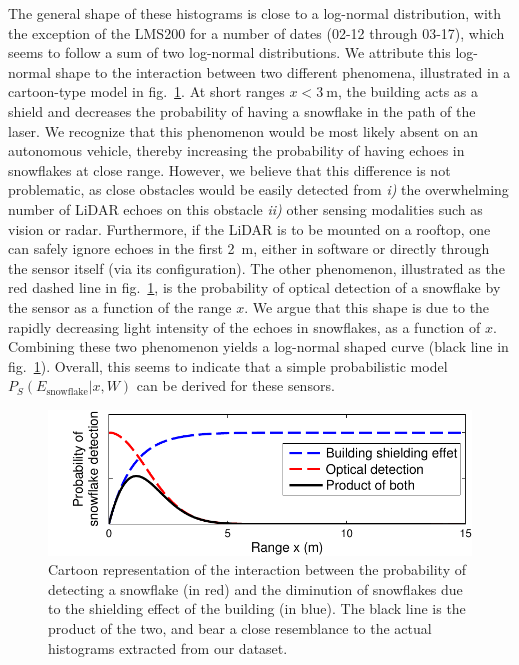 
The general shape of these histograms is close to a log-normal distribution, with the exception of the LMS200 for a number of dates (02-12 through 03-17), which seems to follow a sum of two log-normal distributions. We attribute this log-normal shape to the interaction between two different phenomena, illustrated in a cartoon-type model in fig.~\ref{fig:CartoonModel}. At short ranges $x<\SI{3}{\meter}$, the building acts as a shield and decreases the probability of having a snowflake in the path of the laser. We recognize that this phenomenon would be most likely absent on an autonomous vehicle, thereby increasing the probability of having echoes in snowflakes at close range. However, we believe that this difference is not problematic, as close obstacles would be easily detected from \emph{i)} the overwhelming number of  LiDAR echoes on this obstacle \emph{ii)} other sensing modalities such as vision or radar. Furthermore, if the LiDAR is to be mounted on a rooftop, one can safely ignore echoes in the first \SI{2}{\meter}, either in software or directly through the sensor itself (via its configuration). The other phenomenon, illustrated as the red dashed line in fig.~\ref{fig:CartoonModel}, is the probability of optical detection of a snowflake by the sensor as a function of the range $x$. We argue that this shape is due to the rapidly decreasing light intensity of the echoes in snowflakes, as a function of $x$. Combining these two phenomenon yields a log-normal shaped curve (black line in fig.~\ref{fig:CartoonModel}). Overall, this seems to indicate that a simple probabilistic model $P_S(E_\text{snowflake}|x,W)$ can be derived for these sensors. 

\begin{figure}[th]
    \centering
    \includegraphics[trim={0.6cm 0 0 0},clip,width=0.97\linewidth]{./img/ShieldingModel.pdf}
    \caption{Cartoon representation of the interaction between the probability of detecting a snowflake (in red) and the diminution of snowflakes due to the shielding effect of the building (in blue). The black line is the product of the two, and bear a close resemblance to the actual histograms extracted from our dataset.}
    \label{fig:CartoonModel}
\end{figure}

